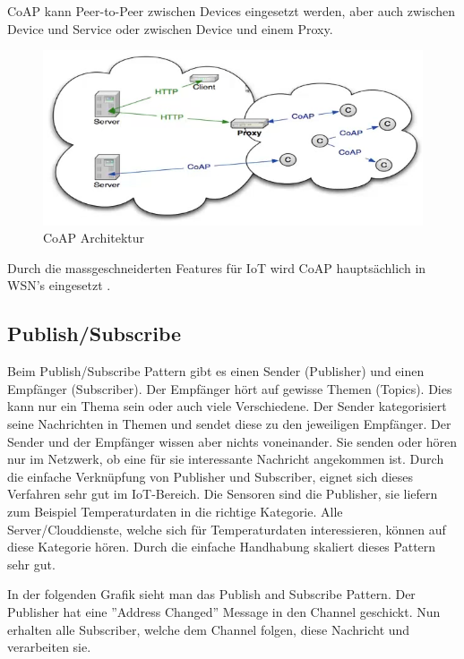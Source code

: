 CoAP kann Peer-to-Peer zwischen Devices eingesetzt werden, aber auch zwischen Device und Service oder zwischen Device und einem Proxy.
\begin{figure}[H]
\centering
\includegraphics[scale=0.8]{images/coap_architecture.png}
\caption{CoAP Architektur \cite{Shelby14}}
\end{figure}
  
Durch die massgeschneiderten Features für IoT wird CoAP hauptsächlich in WSN's eingesetzt \cite{Obermaier15}. 

\subsection{Publish/Subscribe}
Beim Publish/Subscribe Pattern gibt es einen Sender (Publisher) und einen Empfänger (Subscriber). Der Empfänger hört auf gewisse Themen (Topics). Dies kann nur ein Thema sein oder auch viele Verschiedene. Der Sender kategorisiert seine Nachrichten in Themen und sendet diese zu den jeweiligen Empfänger. Der Sender und der Empfänger wissen aber nichts voneinander. Sie senden oder hören nur im Netzwerk, ob eine für sie interessante Nachricht angekommen ist. Durch die einfache Verknüpfung von Publisher und Subscriber, eignet sich dieses Verfahren sehr gut im IoT-Bereich. Die Sensoren sind die Publisher, sie liefern zum Beispiel Temperaturdaten in die richtige Kategorie. Alle Server/Clouddienste, welche sich für Temperaturdaten interessieren, können auf diese Kategorie hören. Durch die einfache Handhabung skaliert dieses Pattern sehr gut.

In der folgenden Grafik sieht man das Publish and Subscribe Pattern. Der Publisher hat eine ''Address Changed'' Message in den Channel geschickt. Nun erhalten alle Subscriber, welche dem Channel folgen, diese Nachricht und verarbeiten sie.

